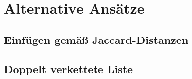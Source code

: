 \section{Alternative Ansätze}\label{sec:alternativen}
\subsection{Einfügen gemäß Jaccard-Distanzen}\label{sec:ähnlichkeit}
\subsection{Doppelt verkettete Liste}\label{sec:verkettete-liste}
%
